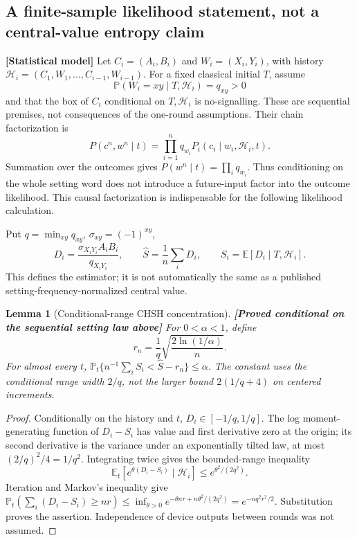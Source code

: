 \documentclass[11pt,a4paper]{article}
\newtheorem{lemma}[theorem]{Lemma}
\theoremstyle{definition}
\theoremstyle{remark}\newtheorem{remark}[theorem]{Remark}
\newcommand{\status}[1]{\textbf{[#1]}\quad}
\newcommand{\Prb}{\mathbb P}
\newcommand{\E}{\mathbb E}
\begin{document}
\subsection{A finite-sample likelihood statement, not a central-value entropy claim}
\status{Statistical model}
Let $C_i=(A_i,B_i)$ and $W_i=(X_i,Y_i)$, with history
$\mathcal H_i=(C_1,W_1,\ldots,C_{i-1},W_{i-1})$. For a fixed classical initial $T$, assume
\[
 \Prb(W_i=xy\mid T,\mathcal H_i)=q_{xy}>0
\]
and that the box of $C_i$ conditional on $T,\mathcal H_i$ is no-signalling. These are sequential premises, not consequences of the one-round assumptions. Their chain factorization is
\begin{equation}\label{exp:causalfactor}
 P(c^n,w^n\mid t)=\prod_{i=1}^n q_{w_i}
 P_i(c_i\mid w_i,\mathcal H_i,t).
\end{equation}
Summation over the outcomes gives $P(w^n\mid t)=\prod_iq_{w_i}$. Thus conditioning on the whole setting word does not introduce a future-input factor into the outcome likelihood. This causal factorization is indispensable for the following likelihood calculation.

Put $q=\min_{xy}q_{xy}$, $\sigma_{xy}=(-1)^{xy}$,
\[
 D_i=\frac{\sigma_{X_iY_i}A_iB_i}{q_{X_iY_i}},\qquad
 \widehat S=\frac1n\sum_iD_i,\qquad
 S_i=\E[D_i\mid T,\mathcal H_i].
\]
This defines the estimator; it is not automatically the same as a published setting-frequency-normalized central value.

\begin{lemma}[Conditional-range CHSH concentration]\label{exp:range}
\status{Proved conditional on the sequential setting law above}
For $0<\alpha<1$, define
\[
 r_n=\frac1q\sqrt{\frac{2\ln(1/\alpha)}n}.
\]
For almost every $t$,
$\Prb_t\{n^{-1}\sum_i S_i<\widehat S-r_n\}\le\alpha$.
The constant uses the conditional range width $2/q$, not the larger bound $2(1/q+4)$ on centered increments.
\end{lemma}
\begin{proof}
Conditionally on the history and $t$, $D_i\in[-1/q,1/q]$. The log moment-generating function of $D_i-S_i$ has value and first derivative zero at the origin; its second derivative is the variance under an exponentially tilted law, at most $(2/q)^2/4=1/q^2$. Integrating twice gives the bounded-range inequality
\[
 \E_t[e^{\theta(D_i-S_i)}\mid\mathcal H_i]
 \le e^{\theta^2/(2q^2)}.
\]
Iteration and Markov's inequality give
$\Prb_t(\sum_i(D_i-S_i)\ge nr)\le
\inf_{\theta>0}e^{-\theta nr+n\theta^2/(2q^2)}
=e^{-nq^2r^2/2}$.
Substitution proves the assertion. Independence of device outputs between rounds was not assumed.
\end{proof}
\end{document}
